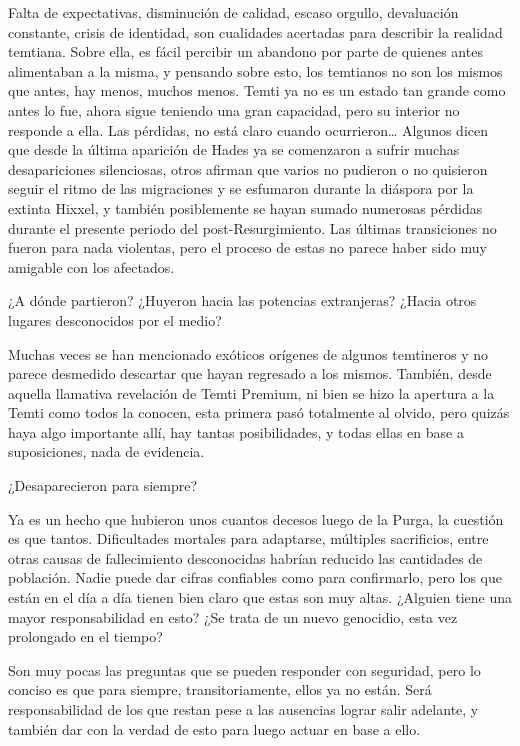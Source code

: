 \documentclass[
]{book}
\begin{document}
Falta de expectativas, disminución de calidad, escaso orgullo, devaluación constante, crisis de identidad, son cualidades acertadas para describir la realidad temtiana. Sobre ella, es fácil percibir un abandono por parte de quienes antes alimentaban a la misma, y pensando sobre esto, los temtianos no son los mismos que antes, hay menos, muchos menos. Temti ya no es un estado tan grande como antes lo fue, ahora sigue teniendo una gran capacidad, pero su interior no responde a ella. Las pérdidas, no está claro cuando ocurrieron\ldots{} Algunos dicen que desde la última aparición de Hades ya se comenzaron a sufrir muchas desapariciones silenciosas, otros afirman que varios no pudieron o no quisieron seguir el ritmo de las migraciones y se esfumaron durante la diáspora por la extinta Hixxel, y también posiblemente se hayan sumado numerosas pérdidas durante el presente periodo del post-Resurgimiento. Las últimas transiciones no fueron para nada violentas, pero el proceso de estas no parece haber sido muy amigable con los afectados.

¿A dónde partieron? ¿Huyeron hacia las potencias extranjeras? ¿Hacia otros lugares desconocidos por el medio?

Muchas veces se han mencionado exóticos orígenes de algunos temtineros y no parece desmedido descartar que hayan regresado a los mismos. También, desde aquella llamativa revelación de Temti Premium, ni bien se hizo la apertura a la Temti como todos la conocen, esta primera pasó totalmente al olvido, pero quizás haya algo importante allí, hay tantas posibilidades, y todas ellas en base a suposiciones, nada de evidencia.

¿Desaparecieron para siempre?

Ya es un hecho que hubieron unos cuantos decesos luego de la Purga, la cuestión es que tantos. Dificultades mortales para adaptarse, múltiples sacrificios, entre otras causas de fallecimiento desconocidas habrían reducido las cantidades de población. Nadie puede dar cifras confiables como para confirmarlo, pero los que están en el día a día tienen bien claro que estas son muy altas. ¿Alguien tiene una mayor responsabilidad en esto? ¿Se trata de un nuevo genocidio, esta vez prolongado en el tiempo?

Son muy pocas las preguntas que se pueden responder con seguridad, pero lo conciso es que para siempre, transitoriamente, ellos ya no están. Será responsabilidad de los que restan pese a las ausencias lograr salir adelante, y también dar con la verdad de esto para luego actuar en base a ello.
\end{document}
